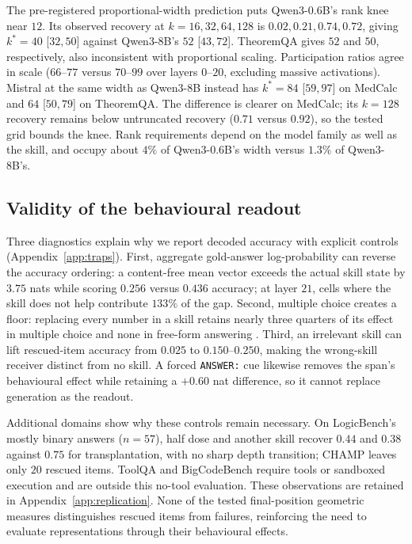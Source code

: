 \documentclass{article}
\begin{document}
The pre-registered proportional-width prediction puts Qwen3-0.6B's rank knee
near $12$. Its observed recovery at $k=16,32,64,128$ is
$0.02,0.21,0.74,0.72$, giving $k^{*}=40$ [$32,50$] against Qwen3-8B's $52$
[$43,72$]. TheoremQA gives $52$ and $50$, respectively, also inconsistent with
proportional scaling. Participation ratios agree in scale ($66$--$77$ versus
$70$--$99$ over layers $0$--$20$, excluding massive activations). Mistral at the
same width as Qwen3-8B instead has $k^{*}=84$ [$59,97$] on MedCalc and $64$
[$50,79$] on TheoremQA. The difference is clearer on MedCalc; its $k=128$
recovery remains below untruncated recovery ($0.71$ versus $0.92$), so the tested
grid bounds the knee. Rank requirements depend on the model family as well as
the skill, and occupy about $4\%$ of Qwen3-0.6B's width versus $1.3\%$ of
Qwen3-8B's.

\subsection{Validity of the behavioural readout}
\label{sec:traps}

Three diagnostics explain why we report decoded accuracy with explicit controls
(Appendix~\ref{app:traps}). First, aggregate gold-answer log-probability can
reverse the accuracy ordering: a content-free mean vector exceeds the actual
skill state by $3.75$ nats while scoring $0.256$ versus $0.436$ accuracy; at
layer $21$, cells where the skill does not help contribute $133\%$ of the gap.
Second, multiple choice creates a floor: replacing every number in a skill
retains nearly three quarters of its effect in multiple choice and none in
free-form answering \citep{balepur2024artifacts}. Third, an irrelevant skill can
lift rescued-item accuracy from $0.025$ to $0.150$--$0.250$, making the wrong-skill
receiver distinct from no skill. A forced \texttt{ANSWER:} cue likewise removes
the span's behavioural effect while retaining a $+0.60$ nat difference, so it
cannot replace generation as the readout.

Additional domains show why these controls remain necessary. On LogicBench's
mostly binary answers ($n=57$), half dose and another skill recover $0.44$ and
$0.38$ against $0.75$ for transplantation, with no sharp depth transition;
CHAMP leaves only $20$ rescued items. ToolQA and BigCodeBench require tools or
sandboxed execution and are outside this no-tool evaluation. These observations
are retained in Appendix~\ref{app:replication}. None of the tested final-position
geometric measures distinguishes rescued items from failures, reinforcing the
need to evaluate representations through their behavioural effects.
\end{document}
